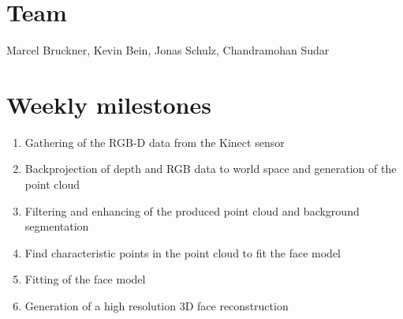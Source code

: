 \documentclass[a4paper,pagesize 10pt]{scrartcl}
\begin{document}
\section{Team}
Marcel Bruckner, Kevin Bein, Jonas Schulz, Chandramohan Sudar

\section{Weekly milestones}
\begin{enumerate}
	\item Gathering of the RGB-D data from the Kinect sensor
	\item Backprojection of depth and RGB data to world space and generation of the point cloud
	\item Filtering and enhancing of the produced point cloud and background segmentation
	\item Find characteristic points in the point cloud to fit the face model
	\item Fitting of the face model
	\item Generation of a high resolution 3D face reconstruction
\end{enumerate}

{\small
	
	
}
\end{document}
